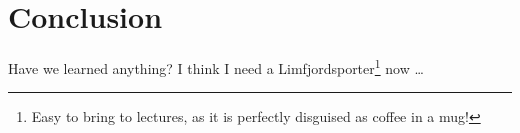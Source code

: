 
\chapter{Conclusion}
\label{chap:conclusion}

Have we learned anything? I think I need a Limfjordsporter\footnote{Easy to bring to
  lectures, as it is perfectly disguised as coffee in a mug!} now \ldots
